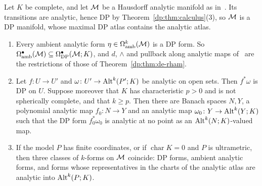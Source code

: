 \begin{proposition}\label{dp:prop:forms-compare}
Let $K$ be complete, and let $\mathcal M$ be a Hausdorff analytic manifold as in~\cite[Section~10.3]{I}. Its transitions are analytic, hence DP by Theorem~\ref{dp:thm:calculus}(3), so $\mathcal M$ is a DP manifold, whose maximal DP atlas contains the analytic atlas.
\begin{enumerate}
\item Every ambient analytic form $\eta\in\Omega^k_{\mathrm{amb}}(\mathcal M)$ is a DP form. So $\Omega^\bullet_{\mathrm{amb}}(\mathcal M)\subseteq\Omega^\bullet_{\mathrm{DP}}(\mathcal M;K)$, and $d$, $\wedge$ and pullback along analytic maps of~\cite[Theorem~10.7]{I} are the restrictions of those of Theorem~\ref{dp:thm:de-rham}.
\item Let $f\colon U\to U'$ and $\omega\colon U'\to\operatorname{Alt}^k(P';K)$ be analytic on open sets. Then $f^*\omega$ is DP on $U$. Suppose moreover that $K$ has characteristic $p>0$ and is not spherically complete, and that $k\ge p$. Then there are Banach spaces $N,Y$, a polynomial analytic map $f_0\colon N\to Y$ and an analytic map $\omega_0\colon Y\to\operatorname{Alt}^k(Y;K)$ such that the DP form $f_0^*\omega_0$ is analytic at no point as an $\operatorname{Alt}^k(N;K)$-valued map.
\item If the model $P$ has finite coordinates, or if $\operatorname{char}K=0$ and $P$ is ultrametric, then three classes of $k$-forms on $\mathcal M$ coincide: DP forms, ambient analytic forms, and forms whose representatives in the charts of the analytic atlas are analytic into $\operatorname{Alt}^k(P;K)$.
\end{enumerate}
\end{proposition}

